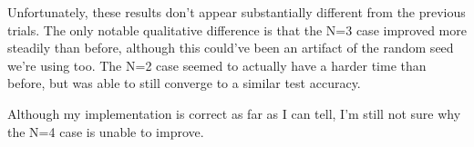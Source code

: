\documentclass[11pt]{article}
\begin{document}

Unfortunately, these results don't appear substantially different from the previous trials. The only notable qualitative difference is that the N=3 case improved more steadily than before, although this could've been an artifact of the random seed we're using too. The N=2 case seemed to actually have a harder time than before, but was able to still converge to a similar test accuracy. 

Although my implementation is correct as far as I can tell, I'm still not sure why the N=4 case is unable to improve.
\end{document}
